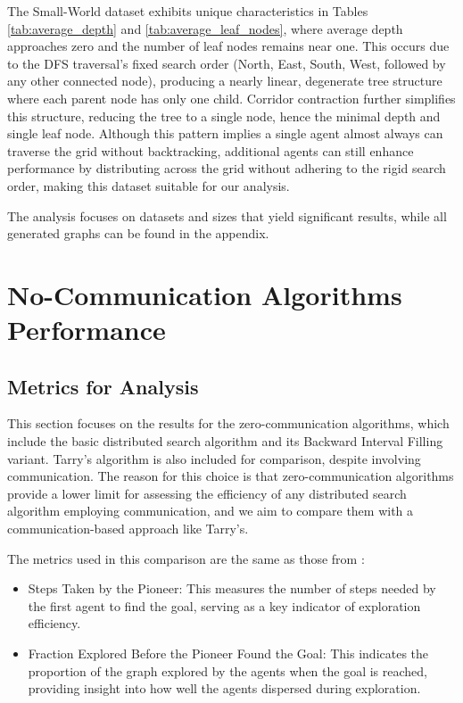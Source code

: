 The Small-World dataset exhibits unique characteristics in Tables \ref{tab:average_depth} and \ref{tab:average_leaf_nodes}, where average depth approaches zero and the number of leaf nodes remains near one. This occurs due to the DFS traversal's fixed search order (North, East, South, West, followed by any other connected node), producing a nearly linear, degenerate tree structure where each parent node has only one child. Corridor contraction further simplifies this structure, reducing the tree to a single node, hence the minimal depth and single leaf node. Although this pattern implies a single agent almost always can traverse the grid without backtracking, additional agents can still enhance performance by distributing across the grid without adhering to the rigid search order, making this dataset suitable for our analysis.

The analysis focuses on datasets and sizes that yield significant results, while all generated graphs can be found in the appendix.


\section{No-Communication Algorithms Performance}
\label{section_result_no_comm}

\subsection{Metrics for Analysis}
\label{subsection_no_comm_metrics}

This section focuses on the results for the zero-communication algorithms, which include the basic distributed search algorithm and its Backward Interval Filling variant. Tarry's algorithm is also included for comparison, despite involving communication. The reason for this choice is that zero-communication algorithms provide a lower limit for assessing the efficiency of any distributed search algorithm employing communication, and we aim to compare them with a communication-based approach like Tarry's.


The metrics used in this comparison are the same as those from :

\begin{itemize}
    \item Steps Taken by the Pioneer: This measures the number of steps needed by the first agent to find the goal, serving as a key indicator of exploration efficiency.
    \item Fraction Explored Before the Pioneer Found the Goal: This indicates the proportion of the graph explored by the agents when the goal is reached, providing insight into how well the agents dispersed during exploration.
\end{itemize}
    
